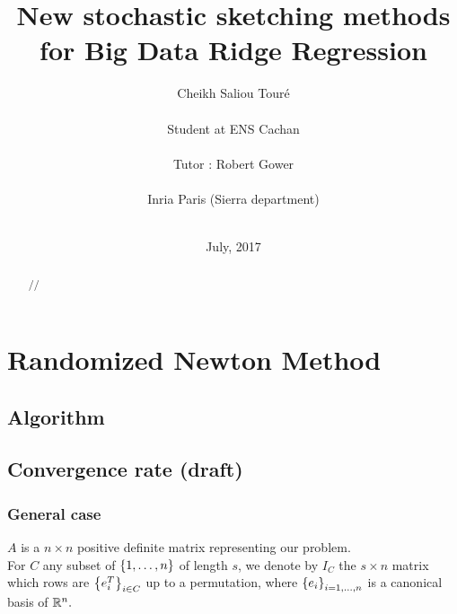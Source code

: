


\usepackage[colorinlistoftodos,bordercolor=orange,backgroundcolor=orange!20,linecolor=orange,textsize=scriptsize]{todonotes}
\newcommand{\rob}[1]{\todo[inline]{\textbf{Robert: }#1}}

\title{New stochastic sketching methods for Big Data Ridge Regression}
\author{Cheikh Saliou Tour\'e \\ \\
Student at ENS Cachan\\\\
Tutor : Robert Gower \\ \\
Inria Paris (Sierra department)\\\\ }




\date{July, 2017}




\renewcommand\bibname{References}
\maketitle


\begin{abstract}

//

\end{abstract}
\tableofcontents
\newpage

\chapter{Randomized Newton Method} \label{newton}

%
%
% 


\section{Algorithm}

\section{Convergence rate (draft)}

\subsection{General case}
$A$ is a $n \times n$ positive definite matrix representing our problem.\\ 
For $C$ any subset of $\left\{1,\dots,n\right\}$ of length $s$, we denote by $I_{C}$ the $s\times n$ matrix which rows are $\left\{e_{i}^{T}\right\}_{i\in C}$ up to a permutation, where $\left\{e_{i}\right\}_{i=1,\dots,n}$ is a canonical basis of ${\mathbb R}^{n}.$\\ 
 
